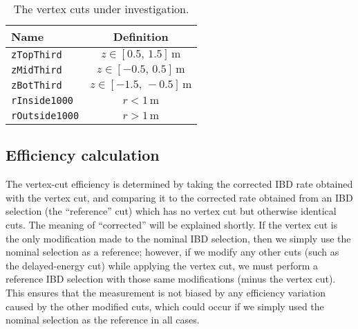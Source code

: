 \documentclass[../thesis.tex]{subfiles}
\begin{document}
\begin{table}[h]
  \begin{tabular}{lc}
    \toprule
    Name & Definition \\
    \midrule
    \texttt{zTopThird} & $z \in [0.5,\, 1.5]\,\mathrm{m}$ \\
    \texttt{zMidThird} & $z \in [-0.5,\, 0.5]\,\mathrm{m}$ \\
    \texttt{zBotThird} & $z \in [-1.5,\, -0.5]\,\mathrm{m}$ \\
    \texttt{rInside1000} & $r < 1\,\mathrm{m}$ \\
    \texttt{rOutside1000} & $r > 1\,\mathrm{m}$ \\
    \bottomrule
  \end{tabular}
  \caption{The vertex cuts under investigation.}
  \label{tab:cutVaryVtxCutCutsTbl}
\end{table}

\begin{comment}
  TODO Try doing vertex efficiency with background subtraction. Oh wait we already do.
\end{comment}

\subsection{Efficiency calculation}
\label{sec:cutVaryVtxCutEffCalc}

The vertex-cut efficiency is determined by taking the corrected IBD rate obtained with the vertex cut, and comparing it to the corrected rate obtained from an IBD selection (the ``reference'' cut) which has no vertex cut but otherwise identical cuts. The meaning of ``corrected'' will be explained shortly. If the vertex cut is the only modification made to the nominal IBD selection, then we simply use the nominal selection as a reference; however, if we modify any other cuts (such as the delayed-energy cut) while applying the vertex cut, we must perform a reference IBD selection with those same modifications (minus the vertex cut). This ensures that the measurement is not biased by any efficiency variation caused by the other modified cuts, which could occur if we simply used the nominal selection as the reference in all cases.
\end{document}
